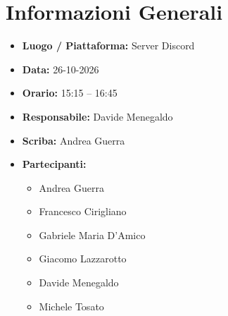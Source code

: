\documentclass[11pt, a4paper]{article}
\newcommand{\DocDate}{26-10-2026}
\begin{document}
\section{Informazioni Generali}
\begin{itemize}
    \item \textbf{Luogo / Piattaforma:} Server Discord
    \item \textbf{Data:} \DocDate
    \item \textbf{Orario:} 15:15 -- 16:45
    \item \textbf{Responsabile:} Davide Menegaldo
    \item \textbf{Scriba:} Andrea Guerra
    \item \textbf{Partecipanti:}
        \begin{itemize}
            \item Andrea Guerra
            \item Francesco Cirigliano
            \item Gabriele Maria D'Amico
            \item Giacomo Lazzarotto
            \item Davide Menegaldo
            \item Michele Tosato
        \end{itemize}
\end{itemize}
\clearpage
\end{document}
